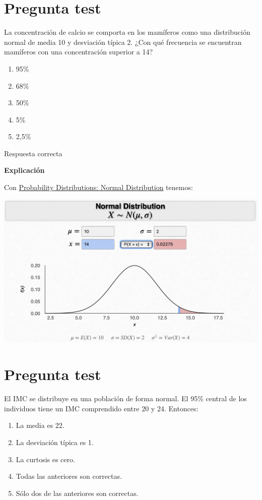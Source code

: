 \documentclass[
]{book}
\providecommand{\tightlist}{%
  \setlength{\itemsep}{0pt}\setlength{\parskip}{0pt}}
\begin{document}
\hypertarget{pregunta-test-100}{%
\section{Pregunta test}\label{pregunta-test-100}}

La concentración de calcio se comporta en los mamíferos como una distribución normal de media 10 y desviación típica 2. ¿Con qué frecuencia se encuentran mamíferos con una concentración superior a 14?

\begin{enumerate}
\def\labelenumi{\alph{enumi})}
\tightlist
\item
  95\%
\item
  68\%
\item
  50\%
\item
  5\%
\item
  2,5\%
\end{enumerate}

Respuesta correcta

\textbf{Explicación}

Con \href{https://homepage.divms.uiowa.edu/~mbognar/applets/normal.html}{Probability Distributions: Normal Distribution} tenemos:

\includegraphics[width=20.78in]{img/3_3}

\hypertarget{pregunta-test-101}{%
\section{Pregunta test}\label{pregunta-test-101}}

El IMC se distribuye en una población de forma normal. El 95\% central de los individuos tiene un IMC comprendido entre 20 y 24. Entonces:

\begin{enumerate}
\def\labelenumi{\alph{enumi})}
\tightlist
\item
  La media es 22.
\item
  La desviación típica es 1.
\item
  La curtosis es cero.
\item
  Todas las anteriores son correctas.
\item
  Sólo dos de las anteriores son correctas.
\end{enumerate}
\end{document}
